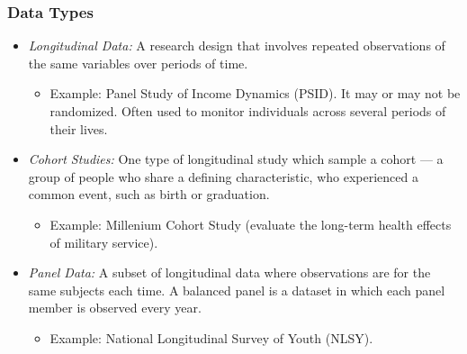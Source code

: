 \begin{frame}
\frametitle{Data Types}
\begin{itemize}
\item \emph{Longitudinal Data:} A research design that involves repeated observations of the same variables over periods of time.
\begin{itemize}
\item Example: Panel Study of Income Dynamics (PSID). It may or may not be randomized. Often used to monitor individuals across several periods of their lives.
\end{itemize}
\item \emph{Cohort Studies:} One type of longitudinal study which sample a cohort --- a group of people who share a defining characteristic, who experienced a common event, such as birth or graduation.
\begin{itemize}
\item Example: Millenium Cohort Study (evaluate the long-term health effects of military service).
\end{itemize}
\item \emph{Panel Data:} A subset of longitudinal data where observations are for the same subjects each time. A balanced panel is a dataset in which each panel member is observed every year.
\begin{itemize}
\item Example: National Longitudinal Survey of Youth (NLSY).
\end{itemize}
\end{itemize}
\end{frame}


